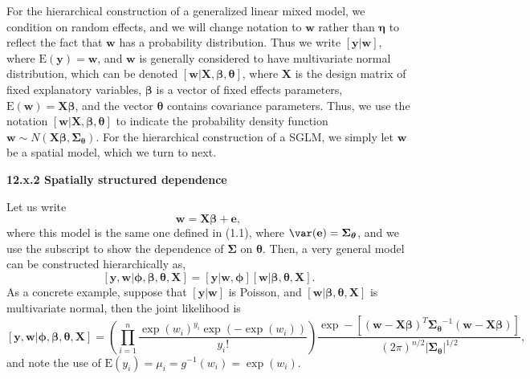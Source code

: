 \documentclass[12pt, titlepage]{article}
\begin{document}
For the hierarchical construction of a generalized linear mixed model, we condition on random effects, and we will change notation to $\mathbf{w}$ rather than $\boldsymbol{\eta}$ to reflect the fact that $\mathbf{w}$ has a probability distribution. Thus we write $[\mathbf{y}|\mathbf{w}]$, where $\textrm{E}(\mathbf{y}) = \mathbf{w}$, and $\mathbf{w}$ is generally considered to have multivariate normal distribution, which can be denoted $[\mathbf{w}|\mathbf{X}, \boldsymbol{\beta}, \boldsymbol{\theta}]$, where $\mathbf{X}$ is the design matrix of fixed explanatory variables, $\boldsymbol{\beta}$ is a vector of fixed effects parameters, $\textrm{E}(\mathbf{w}) = \mathbf{X}\boldsymbol{\beta}$, and the vector $\boldsymbol{\theta}$ contains covariance parameters.   Thus, we use the notation $[\mathbf{w}|\mathbf{X},\boldsymbol{\beta},\boldsymbol{\theta}]$ to indicate the probability density function $\mathbf{w} \sim N(\mathbf{X}\boldsymbol{\beta},\boldsymbol{\Sigma}_{\boldsymbol{\theta}})$. For the hierarchical construction of a SGLM, we simply let $\mathbf{w}$ be a spatial model, which we turn to next.

   

{\large \flushleft \textbf{12.x.2 Spatially structured dependence}}

Let us write
$$
\mathbf{w} = \mathbf{X}\boldsymbol{\beta} + \mathbf{e},
$$
where this model is the same one defined in (1.1), where $\var(\mathbf{e}) = \boldsymbol{\Sigma}_{\boldsymbol{\theta}}$, and we use the subscript to show the dependence of $\boldsymbol{\Sigma}$ on $\boldsymbol{\theta}$. Then, a very general model can be constructed hierarchically as,
\begin{equation} \label{eq:hsglm}
[\mathbf{y},\mathbf{w}|\boldsymbol{\phi},\boldsymbol{\beta},\boldsymbol{\theta},\mathbf{X}] = [\mathbf{y}|\mathbf{w},\boldsymbol{\phi}][\mathbf{w}|\boldsymbol{\beta},\boldsymbol{\theta},\mathbf{X}].
\end{equation}
As a concrete example, suppose that $[\mathbf{y}|\mathbf{w}]$ is Poisson, and $[\mathbf{w}|\boldsymbol{\beta},\boldsymbol{\theta},\mathbf{X}]$ is multivariate normal, then the joint likelihood is
$$
[\mathbf{y},\mathbf{w}|\boldsymbol{\phi},\boldsymbol{\beta},\boldsymbol{\theta},\mathbf{X}] = \left(\prod_{i=1}^{n}\frac{\exp(w_{i})^{y_{i}}\exp(-\exp(w_i))}{y_{i}!}\right)\frac{\exp-[(\mathbf{w} - \mathbf{X}\boldsymbol{\beta})^{T}\boldsymbol{\Sigma_{\boldsymbol{\theta}}}^{-1}(\mathbf{w} - \mathbf{X}\boldsymbol{\beta})]}{(2\pi)^{n/2}|\boldsymbol{\Sigma_{\boldsymbol{\theta}}}|^{1/2}},
$$
and note the use of $\textrm{E}(y_{i}) = \mu_{i} = g^{-1}(w_{i}) = \exp(w_{i})$.
\end{document}
